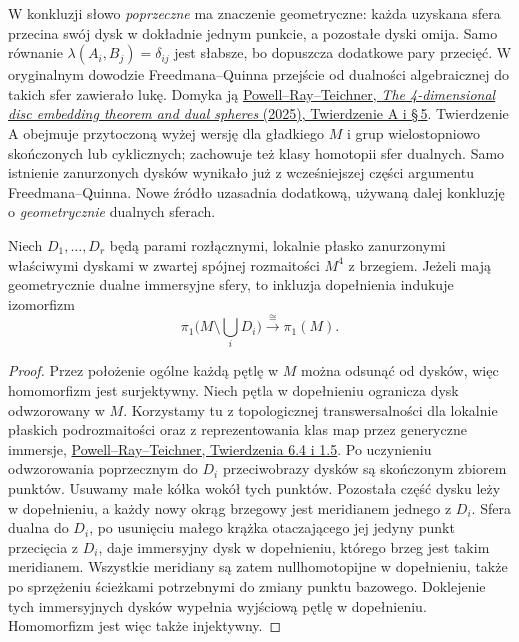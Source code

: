 W konkluzji słowo \emph{poprzeczne} ma znaczenie
geometryczne: każda uzyskana sfera przecina swój
dysk w dokładnie jednym punkcie, a pozostałe dyski
omija. Samo równanie
$\lambda(A_i,B_j)=\delta_{ij}$ jest słabsze, bo
dopuszcza dodatkowe pary przecięć. W oryginalnym
dowodzie Freedmana--Quinna przejście od dualności
algebraicznej do takich sfer zawierało lukę. Domyka
ją \href{https://arxiv.org/pdf/2006.05209}
{Powell--Ray--Teichner, \emph{The 4-dimensional disc
embedding theorem and dual spheres} (2025),
Twierdzenie A i \S\,5}. Twierdzenie A obejmuje
przytoczoną wyżej wersję dla gładkiego $M$ i grup
wielostopniowo skończonych lub cyklicznych; zachowuje
też klasy homotopii sfer dualnych. Samo istnienie
zanurzonych dysków wynikało już z wcześniejszej
części argumentu Freedmana--Quinna. Nowe źródło
uzasadnia dodatkową, używaną dalej konkluzję
o \emph{geometrycznie} dualnych sferach.

\begin{stwierdzenie}
\label{prop:casson-complement-pi1}
Niech $D_1,\ldots,D_r$ będą parami rozłącznymi,
lokalnie płasko zanurzonymi właściwymi dyskami w
zwartej spójnej rozmaitości $M^4$ z brzegiem.
Jeżeli mają geometrycznie
dualne immersyjne sfery, to inkluzja dopełnienia
indukuje izomorfizm
\[
 \pi_1\bigl(M\setminus\textstyle\bigcup_i D_i\bigr)
       \xrightarrow{\ \cong\ }\pi_1(M).
\]
\end{stwierdzenie}
\begin{proof}
Przez położenie ogólne każdą pętlę w $M$ można
odsunąć od dysków, więc homomorfizm jest
surjektywny. Niech pętla w dopełnieniu ogranicza
dysk odwzorowany w $M$. Korzystamy tu z
topologicznej transwersalności dla lokalnie
płaskich podrozmaitości oraz z reprezentowania
klas map przez generyczne immersje,
\href{https://arxiv.org/pdf/2006.05209}
{Powell--Ray--Teichner, Twierdzenia 6.4 i 1.5}.
Po uczynieniu odwzorowania poprzecznym do $D_i$
przeciwobrazy
dysków są skończonym zbiorem punktów. Usuwamy
małe kółka wokół tych punktów. Pozostała część
dysku leży w dopełnieniu, a każdy nowy okrąg
brzegowy jest meridianem jednego z $D_i$.
Sfera dualna do $D_i$, po usunięciu małego krążka
otaczającego jej jedyny punkt przecięcia z $D_i$,
daje immersyjny dysk w dopełnieniu, którego brzeg
jest takim meridianem. Wszystkie meridiany są
zatem nullhomotopijne w dopełnieniu, także po
sprzężeniu ścieżkami potrzebnymi do zmiany punktu
bazowego. Doklejenie tych immersyjnych dysków
wypełnia wyjściową pętlę w dopełnieniu. Homomorfizm
jest więc także injektywny.
\end{proof}

